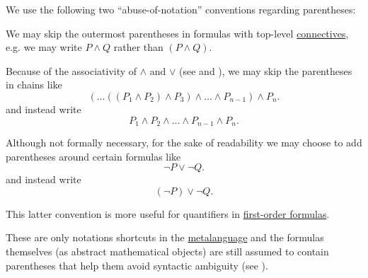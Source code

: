 \begin{remark}\label{rem:propositional_formula_parentheses}
  We use the following two \enquote{abuse-of-notation} conventions regarding parentheses:
  \begin{thmenum}
     We may skip the outermost parentheses in formulas with top-level \hyperref[def:propositional_language/connectives]{connectives}, e.g. we may write \( P \wedge Q \) rather than \( (P \wedge Q) \).

     Because of the associativity of \( \wedge \) and \( \vee \) (see  and ), we may skip the parentheses in chains like
    \begin{equation*}
      ( \ldots ((P_1 \wedge P_2) \wedge P_3) \wedge \ldots \wedge P_{n-1} ) \wedge P_n.
    \end{equation*}
    and instead write
    \begin{equation*}
      P_1 \wedge P_2 \wedge \ldots \wedge P_{n-1} \wedge P_n.
    \end{equation*}

     Although not formally necessary, for the sake of readability we may choose to add parentheses around certain formulas like
    \begin{equation*}
      \neg P \vee \neg Q.
    \end{equation*}
    and instead write
    \begin{equation*}
      (\neg P) \vee \neg Q.
    \end{equation*}

    This latter convention is more useful for quantifiers in \hyperref[def:first_order_syntax/formula]{first-order formulas}.
  \end{thmenum}

  These are only notations shortcuts in the \hyperref[rem:metalogic]{metalanguage} and the formulas themselves (as abstract mathematical objects) are still assumed to contain parentheses that help them avoid syntactic ambiguity (see ).
\end{remark}

